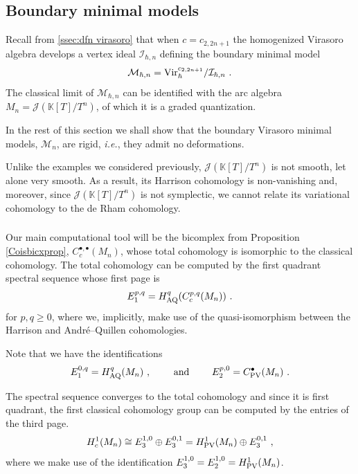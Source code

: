\documentclass[11pt]{amsart}
\numberwithin{equation}{section}
\theoremstyle{definition}
\newcommand{\bb}{\mathbb}
\newcommand{\mc}{\mathcal}
\newcommand{\AQ}{{\textup{AQ}}}
\newcommand{\ik}{{\bb K}}
\newcommand{\Vir}{{\textup{Vir}}}
\newcommand{\PV}{{{\textup{PV}}}}
\newcommand{\0}{{\textbf{0}}}
\newcommand{\MM}{{\textbf{M}}}
\def\II{{\mc I}}
\def\JJ{{\mc J}}
\def\MM{{\mc M}}
\def \ie{{\it i.e.}}
\begin{document}
\subsection{Boundary minimal models}\label{ssec:minimal models}

Recall from \ref{ssec:dfn virasoro} that when $c = c_{2,2n+1}$ the homogenized Virasoro algebra develops a vertex ideal $\II_{\hbar,n}$ defining the boundary minimal model
\[
\MM_{\hbar,n} = \Vir^{c_{2,2n+1}}_\hbar/ \II_{\hbar, n}~.
\]
The classical limit of $\MM_{\hbar,n}$ can be identified with the arc algebra $M_n = \JJ( \ik[T]/T^n)$, of which it is a graded quantization.

In the rest of this section we shall show that the boundary Virasoro minimal models, $\MM_n$, are rigid, \ie, they admit no deformations. 

Unlike the examples we considered previously, $\JJ(\ik[T]/T^n)$ is not smooth, let alone very smooth. As a result, its Harrison cohomology is non-vanishing and, moreover, since $\JJ(\ik[T]/T^n)$ is not symplectic, we cannot relate its variational cohomology to the de Rham cohomology. 

\subsubsection{}
Our main computational tool will be the bicomplex from Proposition \ref{Coisbicxprop}, $ C_{c}^{\bullet,\bullet}(M_n) $, whose total cohomology is isomorphic to the classical cohomology. The total cohomology can be computed by the first quadrant spectral sequence whose first page is
\begin{equation}
E_1^{p,q} = H_{\AQ}^q(C^{p,q}_c(M_n))~.
\end{equation}
for $p,q\ge0$, where we, implicitly, make use of the quasi-isomorphism between the Harrison and Andr\'e--Quillen cohomologies.

Note that we have the identifications
\[
E_1^{0,q} = H^q_{\AQ}(M_n)~, \qquad \text{ and }\qquad E_2^{p,0}=C^\bullet_{\rm PV}(M_n)~.
\]

The spectral sequence converges to the total cohomology and since it is first quadrant, the first classical cohomology group can be computed by the entries of the third page.
\begin{equation}\label{eq:H1 coisson is fixed by E3}
H^1_{c}(M_n) \cong E_3^{1,0}\oplus E_3^{0,1} = H_{\PV}^{1}(M_n)\oplus E_3^{0,1}~,
\end{equation}
where we make use of the identification $E_3^{1,0}= E_2^{1,0}=H_{\PV}^1 (M_n)$.
\end{document}
